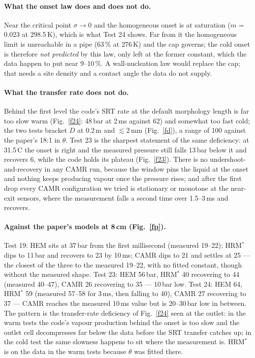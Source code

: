 \documentclass[11pt,a4paper]{article}
\begin{document}
\paragraph{What the onset law does and does not do.} Near the critical point $\sigma \to 0$ and the homogeneous onset is at saturation ($m$ = 0.023 at 298.5\,K), which is what Test 24 shows. Far from it the homogeneous limit is unreachable in a pipe (63\,\% at 276\,K) and the cap governs; the cold onset is therefore \emph{not predicted} by this law, only left at the former constant, which the data happen to put near 9--10\,\%. A wall-nucleation law would replace the cap; that needs a site density and a contact angle the data do not supply.

\paragraph{What the transfer rate does not do.} Behind the first level the code's SRT rate at the default morphology length is far too slow warm (Fig.~\ref{f24}: 48\,bar at 2\,ms against 62) and somewhat too fast cold; the two tests bracket $D$ at 0.2\,m and $\lesssim 2$\,mm (Fig.~\ref{fd}), a range of 100 against the paper's 18:1 in $\theta$. Test 23 is the sharpest statement of the same deficiency: at 31.5\,\textdegree C the onset is right and the measured pressure still falls 13\,bar below it and recovers 6, while the code holds its plateau (Fig.~\ref{f23}). There is no undershoot-and-recovery in any CAMR run, because the window pins the liquid at the onset and nothing keeps producing vapour once the pressure rises; and after the first drop every CAMR configuration we tried is stationary or monotone at the near-exit sensors, where the measurement falls a second time over 1.5--3\,ms and recovers.

\paragraph{Against the paper's models at 8\,cm (Fig.~\ref{fp}).} Test 19: HEM sits at 37\,bar from the first millisecond (measured 19--22); HRM$^*$ dips to 11\,bar and recovers to 23 by 10\,ms; CAMR dips to 21 and settles at 25 --- the closest of the three to the measured 19--22, with no fitted constant, though without the measured shape. Test 23: HEM 56\,bar, HRM$^*$ 40 recovering to 44 (measured 40--47), CAMR 26 recovering to 35 --- 10\,bar low. Test 24: HEM 64, HRM$^*$ 59 (measured 57--58 for 3\,ms, then falling to 40), CAMR 27 recovering to 37 --- CAMR reaches the measured 10\,ms value but is 20--30\,bar low in between. The pattern is the transfer-rate deficiency of Fig.~\ref{f24} seen at the outlet: in the warm tests the code's vapour production behind the onset is too slow and the outlet cell decompresses far below the data before the SRT transfer catches up; in the cold test the same slowness happens to sit where the measurement is. HRM$^*$ is on the data in the warm tests because $\theta$ was fitted there.
\end{document}
